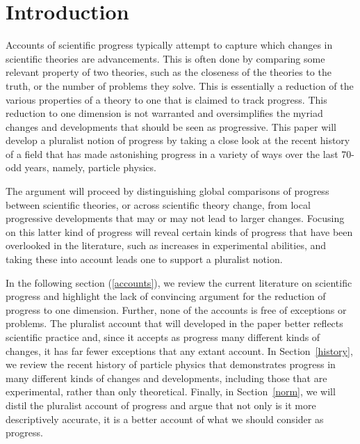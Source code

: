 
\section{Introduction}

Accounts of scientific progress typically attempt to capture which changes in scientific theories are advancements. 
This is often done by comparing some relevant property of two theories, such as the closeness of the theories to the truth, or the number of problems they solve. 
This is essentially a reduction of the various properties of a theory to one that is claimed to track progress. 
This reduction to one dimension is not warranted and oversimplifies the myriad changes and developments that should be seen as progressive. 
This paper will develop a pluralist notion of progress by taking a close look at the recent history of a field that has made astonishing progress in a variety of ways over the last 70-odd years, namely, particle physics. 

The argument will proceed by distinguishing global comparisons of progress between scientific theories, or across scientific theory change, from local progressive developments that may or may not lead to larger changes. 
Focusing on this latter kind of progress will reveal certain kinds of progress that have been overlooked in the literature, such as increases in experimental abilities, and taking these into account leads one to support a pluralist notion. 

In the following section (\ref{accounts}), we review the current literature on scientific progress and highlight the lack of convincing argument for the reduction of progress to one dimension. 
Further, none of the accounts is free of exceptions or problems. 
The pluralist account that will developed in the paper better reflects scientific practice and, since it accepts as progress many different kinds of changes, it has far fewer exceptions that any extant account. 
In Section~\ref{history}, we review the recent history of particle physics that demonstrates progress in many different kinds of changes and developments, including those that are experimental, rather than only theoretical. 
Finally, in Section~\ref{norm}, we will distil the pluralist account of progress and argue that not only is it more descriptively accurate, it is a better account of what we should consider as progress. 